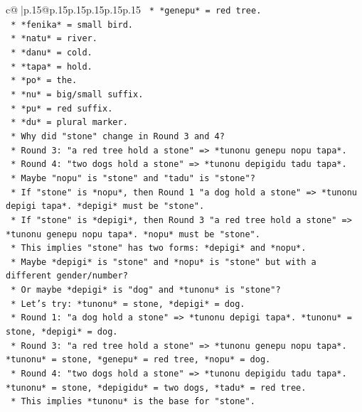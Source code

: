 \documentclass{article}
\begin{document}
{\begin{supertabular}{c@{$\;$}|p{.15\linewidth}@{}p{.15\linewidth}p{.15\linewidth}p{.15\linewidth}p{.15\linewidth}p{.15\linewidth}}
{{{\texttt{        *   *genepu* = red tree.} \\
\texttt{        *   *fenika* = small bird.} \\
\texttt{        *   *natu* = river.} \\
\texttt{        *   *danu* = cold.} \\
\texttt{        *   *tapa* = hold.} \\
\texttt{        *   *po* = the.} \\
\texttt{        *   *nu* = big/small suffix.} \\
\texttt{        *   *pu* = red suffix.} \\
\texttt{        *   *du* = plural marker.} \\
\texttt{        *   Why did "stone" change in Round 3 and 4?} \\
\texttt{        *   Round 3: "a red tree hold a stone" => *tunonu genepu nopu tapa*.} \\
\texttt{        *   Round 4: "two dogs hold a stone" => *tunonu depigidu tadu tapa*.} \\
\texttt{        *   Maybe "nopu" is "stone" and "tadu" is "stone"?} \\
\texttt{        *   If "stone" is *nopu*, then Round 1 "a dog hold a stone" => *tunonu depigi tapa*. *depigi* must be "stone".} \\
\texttt{        *   If "stone" is *depigi*, then Round 3 "a red tree hold a stone" => *tunonu genepu nopu tapa*. *nopu* must be "stone".} \\
\texttt{        *   This implies "stone" has two forms: *depigi* and *nopu*.} \\
\texttt{        *   Maybe *depigi* is "stone" and *nopu* is "stone" but with a different gender/number?} \\
\texttt{        *   Or maybe *depigi* is "dog" and *tunonu* is "stone"?} \\
\texttt{        *   Let's try: *tunonu* = stone, *depigi* = dog.} \\
\texttt{        *   Round 1: "a dog hold a stone" => *tunonu depigi tapa*. *tunonu* = stone, *depigi* = dog.} \\
\texttt{        *   Round 3: "a red tree hold a stone" => *tunonu genepu nopu tapa*. *tunonu* = stone, *genepu* = red tree, *nopu* = dog.} \\
\texttt{        *   Round 4: "two dogs hold a stone" => *tunonu depigidu tadu tapa*. *tunonu* = stone, *depigidu* = two dogs, *tadu* = red tree.} \\
\texttt{        *   This implies *tunonu* is the base for "stone".} \\
}}}
\end{supertabular}}
\end{document}

